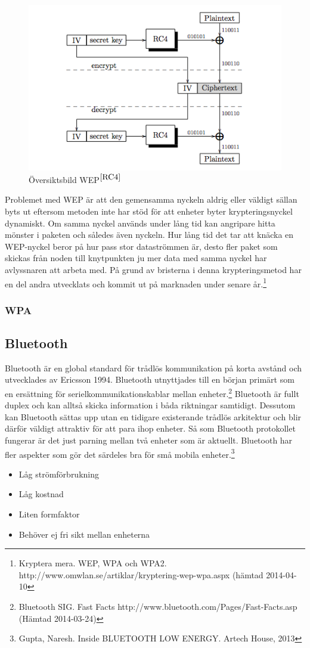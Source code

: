 \documentclass[a4paper,12pt,fleqn]{article}
\begin{document}
\begin{figure}[htp]
  \begin{center}
  \includegraphics[keepaspectratio=true,width=0.5\linewidth]{WEP}  %
  \caption{Översiktsbild WEP$^{\ref{RC4}}$} %
  \end{center}
  \label{fig:overview}
\end{figure}

Problemet med WEP är att den gemensamma nyckeln aldrig eller väldigt sällan byts ut eftersom metoden inte har stöd för att enheter byter krypteringsnyckel dynamiskt. Om samma nyckel används under lång tid kan angripare hitta mönster i paketen och således även nyckeln. Hur lång tid det tar att knäcka en WEP-nyckel beror på hur pass stor dataströmmen är, desto fler paket som skickas från noden till knytpunkten ju mer data med samma nyckel har avlyssnaren att arbeta med. På grund av bristerna i denna krypteringsmetod har en del andra utvecklats och kommit ut på marknaden under senare år.\footnote{\label{WEP}Kryptera mera. WEP, WPA och WPA2. http://www.omwlan.se/artiklar/kryptering-wep-wpa.aspx (hämtad 2014-04-10}

\subsubsection{WPA}

\newpage 

\subsection{Bluetooth}

Bluetooth är en global standard för trådlös kommunikation på korta avstånd och utvecklades av Ericsson 1994. Bluetooth utnyttjades till en början primärt som en ersättning för serielkommunikationskablar mellan enheter.\footnote{\label{BTweb}Bluetooth SIG. Fast Facts http://www.bluetooth.com/Pages/Fast-Facts.asp (Hämtad 2014-03-24)}
Bluetooth är fullt duplex och kan alltså skicka information i båda riktningar samtidigt. Dessutom kan Bluetooth sättas upp utan en tidigare existerande trådlös arkitektur och blir därför väldigt attraktiv för att para ihop enheter. Så som Bluetooth protokollet fungerar är det just parning mellan två enheter som är aktuellt. Bluetooth har fler aspekter som gör det särdeles bra för små mobila enheter.\footnote{\label{Gupta}Gupta, Naresh. Inside BLUETOOTH LOW ENERGY. Artech House, 2013}
\begin{itemize}
\item Låg strömförbrukning 
\item Låg kostnad
\item Liten formfaktor
\item Behöver ej fri sikt mellan enheterna
\end{itemize}
\end{document}
